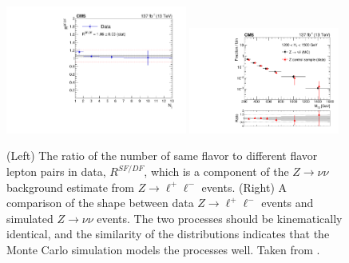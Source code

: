   \begin{figure}[h!]
    \centering
    \includegraphics[width=0.53\textwidth]{figures/MT2_2019/Figure_002-a.pdf}
    \includegraphics[width=0.44\textwidth]{figures/MT2_2019/Figure_002-b.pdf}
    \caption[(Left) The ratio of the number of same flavor to different flavor lepton pairs in data. (Right) A comparison of the \Mttwo shape between data Z to lepton events and simulated Z to neutrino events.]{
      (Left) The ratio of the number of same flavor to different flavor lepton pairs in data, $R^{SF/DF}$, which is a component of the $Z\rightarrow\nu\nu$ background estimate from $Z\rightarrow\ell^+\ell^-$ events. (Right) A comparison of the \Mttwo shape between data $Z\rightarrow\ell^+\ell^-$ events and simulated $Z\rightarrow\nu\nu$ events. The two processes should be kinematically identical, and the similarity of the distributions indicates that the Monte Carlo simulation models the processes well. Taken from \cite{MT2_2019}.}
    \label{fig:Zestimate}
  \end{figure}  

